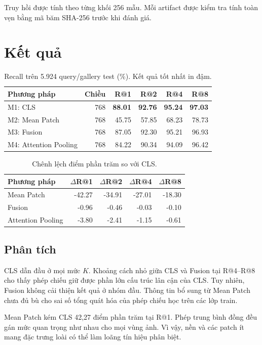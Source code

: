 \documentclass[11pt,a4paper]{article}
\begin{document}
Truy hồi được tính theo từng khối 256 mẫu. Mỗi artifact được kiểm tra tính toàn vẹn bằng mã băm SHA-256 trước khi đánh giá.

\section{Kết quả}
\begin{table}[htbp]
\centering
\caption{Recall trên 5.924 query/gallery test (\%). Kết quả tốt nhất in đậm.}
\label{tab:main-results}
\begin{tabular}{@{}lrrrrr@{}}
\toprule
Phương pháp & Chiều & R@1 & R@2 & R@4 & R@8\\
\midrule
M1: CLS & 768 & \textbf{88.01} & \textbf{92.76} & \textbf{95.24} & \textbf{97.03}\\
M2: Mean Patch & 768 & 45.75 & 57.85 & 68.23 & 78.73\\
M3: Fusion & 768 & 87.05 & 92.30 & 95.21 & 96.93\\
M4: Attention Pooling & 768 & 84.22 & 90.34 & 94.09 & 96.42\\
\bottomrule
\end{tabular}
\end{table}

\begin{table}[htbp]
\centering
\caption{Chênh lệch điểm phần trăm so với CLS.}
\begin{tabular}{@{}lrrrr@{}}
\toprule
Phương pháp & $\Delta$R@1 & $\Delta$R@2 & $\Delta$R@4 & $\Delta$R@8\\
\midrule
Mean Patch & -42.27 & -34.91 & -27.01 & -18.30\\
Fusion & -0.96 & -0.46 & -0.03 & -0.10\\
Attention Pooling & -3.80 & -2.41 & -1.15 & -0.61\\
\bottomrule
\end{tabular}
\end{table}

\subsection{Phân tích}
CLS dẫn đầu ở mọi mức $K$. Khoảng cách nhỏ giữa CLS và Fusion tại R@4--R@8 cho thấy phép chiếu giữ được phần lớn cấu trúc lân cận của CLS. Tuy nhiên, Fusion không cải thiện kết quả ở nhóm đầu. Thông tin bổ sung từ Mean Patch chưa đủ bù cho sai số tổng quát hóa của phép chiếu học trên các lớp train.

Mean Patch kém CLS 42,27 điểm phần trăm tại R@1. Phép trung bình đồng đều gán mức quan trọng như nhau cho mọi vùng ảnh. Vì vậy, nền và các patch ít mang đặc trưng loài có thể làm loãng tín hiệu phân biệt.
\end{document}
